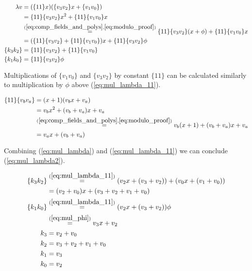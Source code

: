 \begin{equation}
\label{eq:mul_lambda}
\begin{aligned}
\lambda v &= (\{11\}x) (\{v_3v_2\}x + \{v_1v_0\})\\
&= \{11\}\{v_3v_2\}x^2 + \{11\}\{v_1v_0\}x\\
&\stackrel{(\ref{eq:comp_fields_and_polys}, \ref{eq:modulo_proof})}{=}
\{11\}\{v_3v_2\}(x + \phi) + \{11\}\{v_1v_0\}x \\
&= (\{11\}\{v_3v_2\} + \{11\}\{v_1v_0\})x + \{11\}\{v_3v_2\}\phi\\
\{k_3k_2\} &= \{11\}\{v_3v_2\} + \{11\}\{v_1v_0\}\\
\{k_1k_0\} &= \{11\}\{v_3v_2\}\phi
\end{aligned}
\end{equation}

Multiplications of $\{v_1v_0\}$ and $\{v_3v_2\}$ by constant $\{11\}$ can be calculated similarly to multiplication by $\phi$ above (\ref{eq:mul_lambda_11}).

\begin{equation}
\label{eq:mul_lambda_11}
\begin{aligned}
\{11\}\{v_bv_a\} &= (x + 1)(v_bx + v_a)\\
&= v_bx^2 + (v_b + v_a)x + v_a \\
&\stackrel{(\ref{eq:comp_fields_and_polys}, \ref{eq:modulo_proof})}{=}
v_b(x + 1) + (v_b + v_a)x + v_a \\
&= v_ax + (v_b + v_a)
\end{aligned}
\end{equation}

Combining (\ref{eq:mul_lambda}) and (\ref{eq:mul_lambda_11}) we can conclude (\ref{eq:mul_lambda2}).

\begin{equation}
\label{eq:mul_lambda2}
\begin{aligned}
\{k_3k_2\}
&\stackrel{(\ref{eq:mul_lambda_11})}{=}
(v_2x + (v_3 + v_2)) + (v_0x + (v_1 + v_0)) \\
&= (v_2 + v_0)x + (v_3 + v_2 + v_1 + v_0)\\
\{k_1k_0\}
&\stackrel{(\ref{eq:mul_lambda_11})}{=}
(v_2x + (v_3 + v_2))\phi \\
&\stackrel{(\ref{eq:mul_phi})}{=}
v_3x + v_2\\
k_3 &= v_2 + v_0\\
k_2 &= v_3 + v_2 + v_1 + v_0\\
k_1 &= v_3\\
k_0 &= v_2
\end{aligned}
\end{equation}


